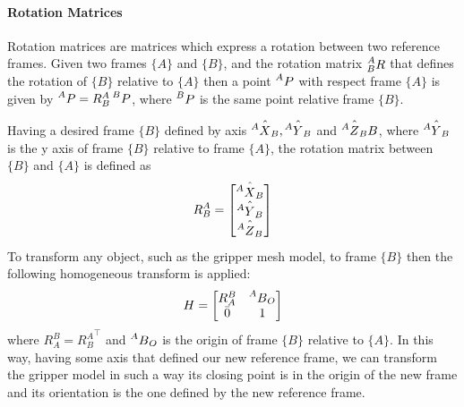 \paragraph{Rotation Matrices}
Rotation matrices are matrices which express a rotation between two reference frames. Given two frames $\{A\}$ and $\{B\}$, and the rotation matrix $\prescript{A}{B}R$ that defines the rotation of $\{B\}$ relative to $\{A\}$ then a point $\prescript{A}{}P$ with respect frame $\{A\}$ is given by $\prescript{A}{}P=R^{A}_{B}\prescript{B}{}P$, where $\prescript{B}{}P$ is the same point relative frame $\{B\}$. 

Having a desired frame $\{B\}$ defined by axis $\hat{\prescript{A}{}X_B},\hat{\prescript{A}{}Y_B}$ and $\hat{\prescript{A}{}Z_B}B$, where $\hat{\prescript{A}{}Y_B}$ is the y axis of frame $\{B\}$ relative to frame $\{A\}$, the rotation matrix between $\{B\}$ and $\{A\}$ is defined as
\[
R^{A}_{B} = 
\begin{bmatrix}
\hat{\prescript{A}{}X_B} \\
\hat{\prescript{A}{}Y_B} \\
\hat{\prescript{A}{}Z_B} \\
\end{bmatrix}
\]
To transform any object, such as the gripper mesh model, to frame $\{B\}$ then the following homogeneous transform is applied:
\[
H = 
\begin{bmatrix}
R^{B}_{A} & \prescript{A}{}B_O \\
\bar{0} & 1
\end{bmatrix}
\]
where  $R^{B}_{A}={R^{A}_{B}}^{\top}$ and $\prescript{A}{}B_O$ is the origin of frame $\{B\}$ relative to $\{A\}$. In this way, having some axis that defined our new reference frame, we can transform the gripper model in such a way its closing point is in the origin of the new frame and its orientation is the one defined by the new reference frame. 

